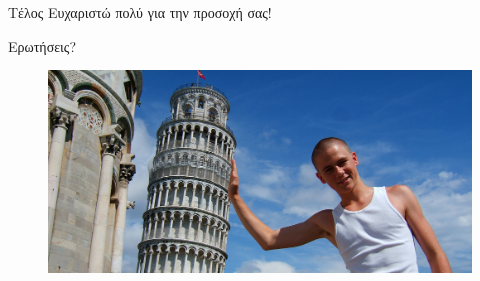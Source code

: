 \documentclass[english,greek]{beamer}
\begin{document}
\begin{frame}{Τέλος}
\centering
Ευχαριστώ πολύ για την προσοχή σας!

Ερωτήσεις?

\begin{figure}
	\includegraphics[scale=0.35]{illusion.png}
\end{figure}
	
\end{frame}
\end{document}
